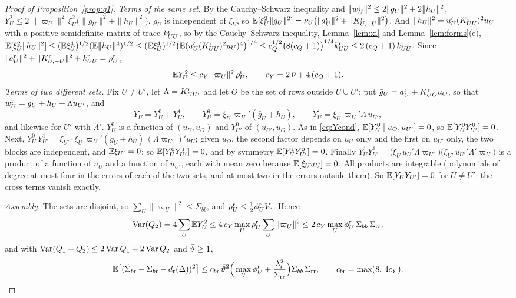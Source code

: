 \begin{proof}[Proof of Proposition~\ref{prop:q1}]
\emph{Terms of the same set.} By the Cauchy--Schwarz inequality and $\|w^{\rm r}_U\|^2\le2\|g_U\|^2+2\|h_U\|^2$,
$Y_U^2\le2\,\|\varpi_U\|^2\,\xi_U^2\big(\|g_U\|^2+\|h_U\|^2\big)$. $g_U$ is independent of $\xi_U$, so
$\mathbb{E}[\xi_U^2\|g_U\|^2]=\nu_U\big(\|a^{\rm r}_U\|^2+\|K^{\rm r}_{U,-U}\|^2\big)$. And
$\|h_U\|^2=u_U'(K^{\rm r}_{UU})^2u_U$ with a positive semidefinite matrix of trace $k^{\rm r}_{UU}$, so by the
Cauchy--Schwarz inequality, Lemma~\ref{lem:xi} and Lemma~\ref{lem:forms}(e),
$\mathbb{E}[\xi_U^2\|h_U\|^2]\le(\mathbb{E}\xi_U^4)^{1/2}(\mathbb{E}\|h_U\|^4)^{1/2}\le(\mathbb{E}\xi_U^4)^{1/2}\big(\mathbb{E}(u_U'(K^{\rm r}_{UU})^2u_U)^4\big)^{1/4}
\le c_Q^{1/2}\big(8(c_Q+1)\big)^{1/4}k^{\rm r}_{UU}\le2\,(c_Q+1)\,k^{\rm r}_{UU}$. Since
$\|a^{\rm r}_U\|^2+\|K^{\rm r}_{U,-U}\|^2+k^{\rm r}_{UU}=\rho^{\rm r}_U$,
\[
\mathbb{E} Y_U^2\le c_Y\,\|\varpi_U\|^2\,\rho^{\rm r}_U,\qquad c_Y=2\,\bar\nu+4\,(c_Q+1).
\]
\emph{Terms of two different sets.} Fix $U\ne U'$, let $\Lambda=K^{\rm r}_{UU'}$ and let $O$ be the set of rows outside
$U\cup U'$; put $\bar g_U=a^{\rm r}_U+K^{\rm r}_{UO}u_O$, so that $w^{\rm r}_U=\bar g_U+h_U+\Lambda u_{U'}$, and
\[
Y_U=Y_U^0+Y_U^1,\qquad Y_U^0=\xi_U\,\varpi_U'(\bar g_U+h_U),\qquad Y_U^1=\xi_U\,\varpi_U'\Lambda\,u_{U'},
\]
and likewise for $U'$ with $\Lambda'$. $Y_U^0$ is a function of $(u_U,u_O)$ and $Y_{U'}^0$ of $(u_{U'},u_O)$. As in
\eqref{eq:Ycond}, $\mathbb{E}[Y_U^0\mid u_O,u_{U'}]=0$, so $\mathbb{E}[Y_U^0Y_{U'}^0]=0$. Next,
$Y_U^0\,Y_{U'}^1=\xi_{U'}\cdot\xi_U\,\varpi_U'(\bar g_U+h_U)\,(\Lambda\varpi_{U'})'u_U$; given $u_O$, the second
factor depends on $u_U$ only and the first on $u_{U'}$ only, the two blocks are independent, and $\mathbb{E}\xi_{U'}=0$: so
$\mathbb{E}[Y_U^0Y_{U'}^1]=0$, and by symmetry $\mathbb{E}[Y_U^1Y_{U'}^0]=0$. Finally
$Y_U^1Y_{U'}^1=\big(\xi_U\,u_U'\Lambda\varpi_{U'}\big)\big(\xi_{U'}\,u_{U'}'\Lambda'\varpi_U\big)$ is a product of a
function of $u_U$ and a function of $u_{U'}$, each with mean zero because $\mathbb{E}[\xi_Uu_U]=0$. All products are
integrable (polynomials of degree at most four in the errors of each of the two sets, and at most two in the
errors outside them). So
$\mathbb{E}[Y_UY_{U'}]=0$ for $U\ne U'$: the cross terms vanish exactly.

\emph{Assembly.} The sets are disjoint, so $\sum_U\|\varpi_U\|^2\le\Sigma_{bb}$, and
$\rho^{\rm r}_U\le\frac12\phi^{\rm r}_UV_{\rm r}$. Hence
\[
\operatorname{Var}(Q_2)=4\sum_U\mathbb{E} Y_U^2\le4\,c_Y\max_U\rho^{\rm r}_U\sum_U\|\varpi_U\|^2\le2\,c_Y\max_U\phi^{\rm r}_U\,\Sigma_{bb}\,\Sigma_{\rm rr},
\]
and with $\operatorname{Var}(Q_1+Q_2)\le2\operatorname{Var} Q_1+2\operatorname{Var} Q_2$ and $\bar\vartheta\ge1$,
\[
\mathbb{E}\big[(\hat\Sigma_{b{\rm r}}-\Sigma_{b{\rm r}}-d_{\rm r}(\Delta))^2\big]\le
c_{b{\rm r}}\,\bar\vartheta^2\Big(\max_U\phi^{\rm r}_U+\frac{\lambda_{\rm r}^2}{\Sigma_{\rm rr}}\Big)\Sigma_{bb}\,\Sigma_{\rm rr},
\qquad c_{b{\rm r}}=\max(8,\,4c_Y).
\]


\end{proof}
